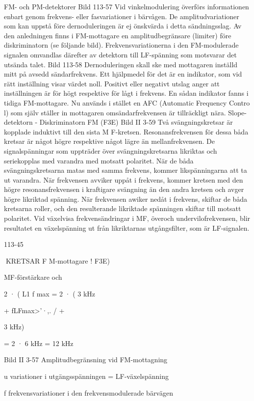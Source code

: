 \documentclass[a4paper,twoside,twocolumn,openright]{book}
\begin{document}
{{{{{{{FM- och PM-detektorer
Bild 113-57
Vid vinkelmodulering överförs informationen
enbart genom frekvens- eller fasvariationer
i bärvågen. De amplitudvariationer som kan
uppstå före dernoduleringen är ej önskvärda
i detta sändningsslag. Av den anledningen
finns i FM-mottagare en amplitudbegränsare (limiter) före diskriminatorn (se följande
bild). Frekvensvariationerna i den FM-modulerade signalen omvandlas därefter av
detektorn till LF-spänning som motsvarar
det utsända talet.
Bild 113-58
Dernoduleringen skall ske med mottagaren inställd mitt på avsedd sändarfrekvens.
Ett hjälpmedel för det är en indikator, som vid
rätt inställning visar värdet noll. Positivt eller
negativt utslag anger att inställningen är för
högt respektive för lågt i frekvens. En sådan
indikator fanns i tidiga FM-mottagare. Nu
används i stället en AFC (Automatic Frequency Contro l) som själv ställer in mottagaren omsändarfrekvensen är tillräckligt nära.
Slope-detektorn - Diskriminatorn FM (F3E)
Bild II 3-59
Två svängningskretsar är kopplade induktivt
till den sista M F-kretsen. Resonansfrekvensen för dessa båda kretsar är något högre
respektive något lägre än mellanfrekvensen. De signalspänningar som uppträder
över svängningskretsarna likriktas och seriekopplas med varandra med motsatt polaritet.
När de båda svängningskretsarna matas
med samma frekvens, kommer likspänningarna att ta ut varandra. När frekvensen avviker uppåt i frekvens, kommer kretsen med
den högre resonansfrekvensen i kraftigare
svängning än den andra kretsen och avger
högre likriktad spänning. När frekvensen
awiker nedåt i frekvens, skiftar de båda
kretsarna roller, och den resulterande likriktade spänningen skiftar till motsatt polaritet.
Vid växelvisa frekvensändringar i MF,
överoch undervilofrekvensen, blir resultatet
en växelspänning ut från likriktarnas utgångsfilter, som är LF-signalen.

113-45

KRETSAR
F M-mottagare ! F3E)

MF-förstärkare och

2 · ( L1 f max
= 2 · ( 3 kHz

+ fLFmax>'·,.      /
+

3 kHz)

= 2 · 6 kHz = 12 kHz

Bild II 3-57 Amplitudbegränsning vid FM-mottagning

u
variationer i utgängsspänningen =
LF-växelspänning

f
frekvensvariationer i
den frekvensmodulerade bärvägen

}}}}}}}
\end{document}
